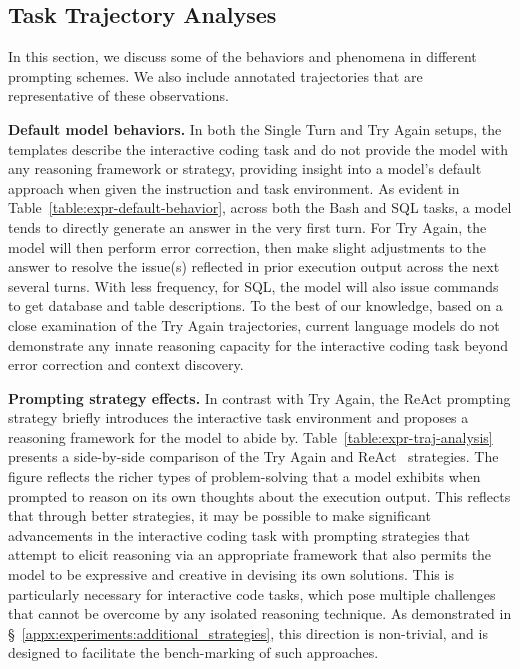 \subsection{Task Trajectory Analyses}
\label{appx:experiments:trajectory_analyses}

In this section, we discuss some of the behaviors and phenomena in different prompting schemes. We also include annotated trajectories that are representative of these observations.



\textbf{Default model behaviors.} In both the Single Turn and Try Again setups, the templates describe the interactive coding task and do not provide the model with any reasoning framework or strategy, providing insight into a model's default approach when given the instruction and task environment. As evident in Table~\ref{table:expr-default-behavior}, across both the Bash and SQL tasks, a model tends to directly generate an answer in the very first turn. For Try Again, the model will then perform error correction, then make slight adjustments to the answer to resolve the issue(s) reflected in prior execution output across the next several turns. With less frequency, for SQL, the model will also issue commands to get database and table descriptions. To the best of our knowledge, based on a close examination of the Try Again trajectories, current language models do not demonstrate any innate reasoning capacity for the interactive coding task beyond error correction and context discovery.



\textbf{Prompting strategy effects.} In contrast with Try Again, the ReAct prompting strategy briefly introduces the interactive task environment and proposes a reasoning framework for the model to abide by. Table~\ref{table:expr-traj-analysis} presents a side-by-side comparison of the Try Again and ReAct~\cite{yao2023react} strategies. The figure reflects the richer types of problem-solving that a model exhibits when prompted to reason on its own thoughts about the execution output. This reflects that through better strategies, it may be possible to make significant advancements in the interactive coding task with prompting strategies that attempt to elicit reasoning via an appropriate framework that also permits the model to be expressive and creative in devising its own solutions. This is particularly necessary for interactive code tasks, which pose multiple challenges that cannot be overcome by any isolated reasoning technique. As demonstrated in \S~\ref{appx:experiments:additional_strategies}, this direction is non-trivial, and \benchmark{} is designed to facilitate the bench-marking of such approaches.

